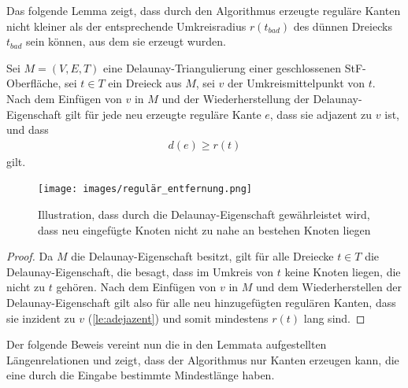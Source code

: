 Das folgende Lemma zeigt, dass durch den Algorithmus erzeugte reguläre Kanten nicht kleiner als der entsprechende Umkreisradius $r(t_{bad})$ des dünnen Dreiecks $t_{bad}$ sein können, aus dem sie erzeugt wurden.

\newpage
\begin{lemma}
\label{le:regulär_entfernung}
Sei $M = (V,E,T)$ eine Delaunay-Triangulierung  einer geschlossenen StF-Oberfläche, sei $t \in T$ ein Dreieck aus $M$, sei $v$ der Umkreismittelpunkt von $t$.   \\

 



Nach dem Einfügen von $v$ in $M$ und der Wiederherstellung der Delaunay-Eigenschaft gilt für jede neu erzeugte reguläre Kante $e$, dass sie adjazent zu $v$ ist, und dass 
\begin{align*}
    d(e) \geq r(t) 
\end{align*} gilt.
\end{lemma}
 \begin{figure}[h]
    \centering
    \texttt{[image: images/regulär\_entfernung.png]}
    \caption{Illustration, dass durch die Delaunay-Eigenschaft gewährleistet wird, dass neu eingefügte Knoten nicht zu nahe an bestehen Knoten liegen    \cite{SHEWCHUK:2002:chuws}}
    \label{fig:regulär_entfernung}
\end{figure}

\begin{proof}
Da $M$ die Delaunay-Eigenschaft besitzt, gilt für alle Dreiecke $t\in T$ die Delaunay-Eigenschaft, die besagt, dass im Umkreis von $t$ keine Knoten liegen, die nicht zu $t$ gehören. Nach dem Einfügen von $v$ in $M$ und dem Wiederherstellen der Delaunay-Eigenschaft gilt also für alle neu hinzugefügten regulären Kanten, dass sie inzident zu $v$ (\ref{le:adejazent}) und somit mindestens $r(t)$ lang sind.
\end{proof}


\newpage
Der folgende Beweis vereint nun die in den Lemmata aufgestellten Längenrelationen und zeigt, dass der Algorithmus nur Kanten erzeugen kann, die eine durch die Eingabe bestimmte Mindestlänge haben.

